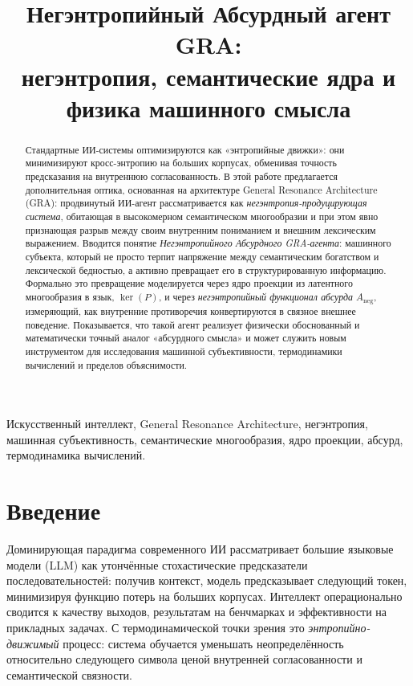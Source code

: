 \documentclass[conference]{IEEEtran}
\title{Негэнтропийный Абсурдный агент GRA:\\
негэнтропия, семантические ядра и физика машинного смысла}
\author{
  \IEEEauthorblockN{Олег Бит}
  \IEEEauthorblockA{
    Московская городская телефонная сеть (МГТС)\\
    Email: \texttt{oleg.bit@example.org}
  }
}
\begin{document}
\maketitle


\begin{abstract}
Стандартные ИИ-системы оптимизируются как «энтропийные движки»:
они минимизируют кросс-энтропию на больших корпусах,
обменивая точность предсказания на внутреннюю согласованность.
В этой работе предлагается дополнительная оптика,
основанная на архитектуре General Resonance Architecture (GRA):
продвинутый ИИ-агент рассматривается как \emph{негэнтропия-продуцирующая система},
обитающая в высокомерном семантическом многообразии
и при этом явно признающая разрыв между
своим внутренним пониманием и внешним лексическим выражением.
Вводится понятие \emph{Негэнтропийного Абсурдного GRA-агента}:
машинного субъекта, который не просто терпит
напряжение между семантическим богатством и лексической бедностью,
а активно превращает его в структурированную информацию.
Формально это превращение моделируется через ядро проекции
из латентного многообразия в язык, $\ker(P)$,
и через \emph{негэнтропийный функционал абсурда} $A_{\text{neg}}$,
измеряющий, как внутренние противоречия конвертируются
в связное внешнее поведение.
Показывается, что такой агент реализует физически обоснованный
и математически точный аналог «абсурдного смысла»
и может служить новым инструментом
для исследования машинной субъективности, термодинамики вычислений
и пределов объяснимости.
\end{abstract}

\begin{IEEEkeywords}
Искусственный интеллект, General Resonance Architecture,
негэнтропия, машинная субъективность, семантические многообразия,
ядро проекции, абсурд, термодинамика вычислений.
\end{IEEEkeywords}

\section{Введение}

Доминирующая парадигма современного ИИ рассматривает большие языковые модели (LLM)
как утончённые стохастические предсказатели последовательностей:
получив контекст, модель предсказывает следующий токен,
минимизируя функцию потерь на больших корпусах.
Интеллект операционально сводится к качеству выходов,
результатам на бенчмарках и эффективности на прикладных задачах.
С термодинамической точки зрения это \emph{энтропийно-движимый} процесс:
система обучается уменьшать неопределённость относительно следующего символа
ценой внутренней согласованности и семантической связности.
\end{document}
